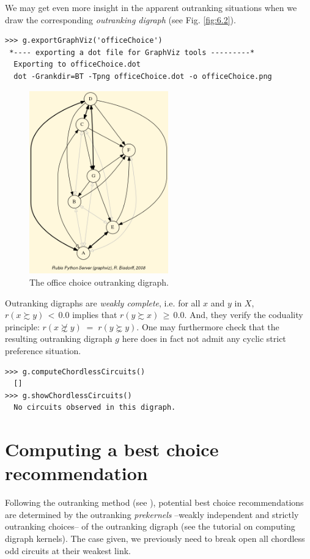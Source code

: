 We may get even more insight in the apparent outranking situations when we draw the corresponding \emph{outranking digraph} (see Fig. \ref{fig:6.2}).
\begin{lstlisting}
>>> g.exportGraphViz('officeChoice')
 *---- exporting a dot file for GraphViz tools ---------*
  Exporting to officeChoice.dot
  dot -Grankdir=BT -Tpng officeChoice.dot -o officeChoice.png
\end{lstlisting}
\begin{figure}[h]
\sidecaption
\includegraphics[width=6cm]{Figures/officeChoice.png}
\caption{The office choice outranking digraph.}
\label{fig:6.3}       %
\end{figure}

Outranking digraphs are \emph{weakly complete}, i.e. for all $x$ and $y$ in $X$, $r(x \succsim y)\, <\, 0.0$ implies that $r(y \succsim x)\, \geq\, 0.0$. And, they verify the coduality principle:  $r(x \not\succsim y) \;=\; r(y \succnsim y)$. One may furthermore check that the resulting outranking digraph $g$ here does in fact not admit any cyclic strict preference situation.

\begin{lstlisting}
>>> g.computeChordlessCircuits()
  []
>>> g.showChordlessCircuits()
  No circuits observed in this digraph.
\end{lstlisting}

\section{Computing a \Rubis best choice recommendation}
\label{sec:6.3}

Following the \Rubis outranking method (see \citet{BIS-2008a}), potential best choice recommendations are determined by the outranking \emph{prekernels} --weakly independent and strictly outranking choices-- of the outranking digraph (see the tutorial on computing digraph kernels). The case given, we previously need to break open all chordless odd circuits at their weakest link.

